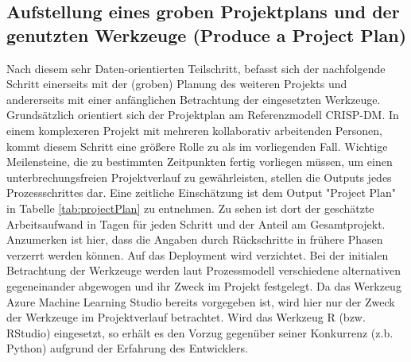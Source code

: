 \subsection*{Aufstellung eines groben Projektplans und der genutzten Werkzeuge (Produce a Project Plan)} \label{subsec:projectPlan}
Nach diesem sehr Daten-orientierten Teilschritt, befasst sich der nachfolgende Schritt einerseits mit der (groben) Planung des weiteren Projekts und andererseits mit einer anfänglichen Betrachtung der eingesetzten Werkzeuge. Grundsätzlich orientiert sich der Projektplan am Referenzmodell CRISP-DM. In einem komplexeren Projekt mit mehreren kollaborativ arbeitenden Personen, kommt diesem Schritt eine größere Rolle zu als im vorliegenden Fall. Wichtige Meilensteine, die zu bestimmten Zeitpunkten fertig vorliegen müssen, um einen unterbrechungsfreien Projektverlauf zu gewährleisten, stellen die Outputs jedes Prozessschrittes dar. Eine zeitliche Einschätzung ist dem Output "Project Plan" in Tabelle \ref{tab:projectPlan} zu entnehmen. Zu sehen ist dort der geschätzte Arbeitsaufwand in Tagen für jeden Schritt und der Anteil am Gesamtprojekt. Anzumerken ist hier, dass die Angaben durch Rückschritte in frühere Phasen verzerrt werden können. Auf das Deployment wird verzichtet.  \newline
Bei der initialen Betrachtung der Werkzeuge werden laut Prozessmodell verschiedene alternativen gegeneinander abgewogen und ihr Zweck im Projekt festgelegt. Da das Werkzeug Azure Machine Learning Studio bereits vorgegeben ist, wird hier nur der Zweck der Werkzeuge im Projektverlauf betrachtet. Wird das Werkzeug R (bzw. RStudio) eingesetzt, so erhält es den Vorzug gegenüber seiner Konkurrenz (z.b. Python) aufgrund der Erfahrung des Entwicklers.


